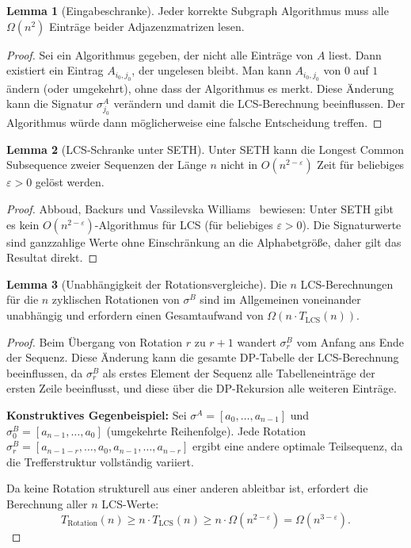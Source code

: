 ﻿\documentclass[a4paper,12pt]{article}
\theoremstyle{definition}
\newtheorem{lemma}{Lemma}
\begin{document}
\begin{lemma}[Eingabeschranke]
\label{lem:eingabe}
Jeder korrekte Subgraph Algorithmus muss alle $\Omega(n^2)$ Einträge beider
Adjazenzmatrizen lesen.
\end{lemma}

\begin{proof}
Sei ein Algorithmus gegeben, der nicht alle Einträge von $A$ liest. Dann existiert
ein Eintrag $A_{i_0,j_0}$, der ungelesen bleibt. Man kann $A_{i_0,j_0}$ von $0$ auf
$1$ ändern (oder umgekehrt), ohne dass der Algorithmus es merkt. Diese Änderung kann
die Signatur $\sigma_{j_0}^A$ verändern und damit die LCS-Berechnung beeinflussen.
Der Algorithmus würde dann möglicherweise eine falsche Entscheidung treffen.
\end{proof}

\begin{lemma}[LCS-Schranke unter SETH]
\label{lem:lcs}
Unter SETH kann die Longest Common Subsequence zweier Sequenzen der Länge $n$
nicht in $O(n^{2-\varepsilon})$ Zeit für beliebiges $\varepsilon > 0$ gelöst werden.
\end{lemma}

\begin{proof}
Abboud, Backurs und Vassilevska Williams~\cite{abboud2015} bewiesen: Unter SETH gibt
es kein $O(n^{2-\varepsilon})$-Algorithmus für LCS (für beliebiges $\varepsilon > 0$).
Die Signaturwerte sind ganzzahlige Werte ohne Einschränkung an die Alphabetgröße, daher
gilt das Resultat direkt.
\end{proof}

\begin{lemma}[Unabhängigkeit der Rotationsvergleiche]
\label{lem:unabhaengigkeit}
Die $n$ LCS-Berechnungen für die $n$ zyklischen Rotationen von $\sigma^B$ sind
im Allgemeinen voneinander unabhängig und erfordern einen Gesamtaufwand von
$\Omega(n \cdot T_{\mathrm{LCS}}(n))$.
\end{lemma}

\begin{proof}
Beim Übergang von Rotation $r$ zu $r+1$ wandert $\sigma_r^B$ vom Anfang ans Ende
der Sequenz. Diese Änderung kann die gesamte DP-Tabelle der LCS-Berechnung beeinflussen,
da $\sigma_r^B$ als erstes Element der Sequenz alle Tabelleneinträge der ersten Zeile
beeinflusst, und diese über die DP-Rekursion alle weiteren Einträge.

\textbf{Konstruktives Gegenbeispiel:} Sei $\sigma^A = [a_0,\ldots,a_{n-1}]$ und
$\sigma^B_0 = [a_{n-1},\ldots,a_0]$ (umgekehrte Reihenfolge). Jede Rotation
$\sigma^B_r = [a_{n-1-r},\ldots,a_0,a_{n-1},\ldots,a_{n-r}]$ ergibt eine andere
optimale Teilsequenz, da die Trefferstruktur vollständig variiert.

Da keine Rotation strukturell aus einer anderen ableitbar ist, erfordert die Berechnung
aller $n$ LCS-Werte:
\[
  T_{\text{Rotation}}(n) \geq n \cdot T_{\mathrm{LCS}}(n)
  \geq n \cdot \Omega(n^{2-\varepsilon}) = \Omega(n^{3-\varepsilon}).
\]
\end{proof}
\end{document}
